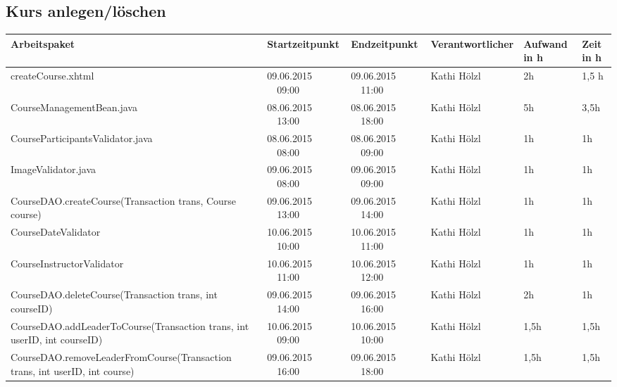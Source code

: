 \begin{landscape}
	\subsection{Kurs anlegen/löschen}
	\begin{tabular}{|p{10.3cm}|p{3.2cm}|p{3.2cm}|p{3.5cm}|p{1.7cm}|p{1.5cm}|}
		\hline  \textbf{Arbeitspaket} & \textbf{Startzeitpunkt} & \textbf{Endzeitpunkt} & \textbf{Verantwortlicher}  & \textbf{Aufwand in h} & \textbf{Zeit in h}\\ 
		\hline   createCourse.xhtml                                    & 09.06.2015 \ \ 09:00     & 09.06.2015 \ \ 11:00     &       Kathi Hölzl & 2h  & 1,5 h\\
		\hline   CourseManagementBean.java                             & 08.06.2015 \ \ 13:00     & 08.06.2015 \ \ 18:00     &      Kathi Hölzl & 5h & 3,5h\\
		\hline   CourseParticipantsValidator.java                        & 08.06.2015 \ \ 08:00     & 08.06.2015 \ \ 09:00           & Kathi Hölzl &      1h    &      1h      \\
		\hline   ImageValidator.java                                   & 09.06.2015 \ \ 08:00     & 09.06.2015 \ \ 09:00      & Kathi Hölzl  &      1h              &      1h    \\
		\hline   CourseDAO.createCourse(Transaction trans, Course course)    & 09.06.2015 \ \ 13:00     & 09.06.2015 \ \ 14:00             & Kathi Hölzl  &      1h       &      1h      \\
		\hline   CourseDateValidator                                         & 10.06.2015 \ \ 10:00     & 10.06.2015 \ \ 11:00           & Kathi Hölzl  &      1h &      1h\\
		\hline   CourseInstructorValidator                                   & 10.06.2015 \ \ 11:00     & 10.06.2015 \ \ 12:00            & Kathi Hölzl  &      1h  &      1h \\
		\hline   CourseDAO.deleteCourse(Transaction trans, int courseID)     & 09.06.2015 \ \ 14:00     & 09.06.2015 \ \ 16:00                & Kathi Hölzl  &      2h   &      1h  \\
		\hline   CourseDAO.addLeaderToCourse(Transaction trans, int userID, int courseID)    & 10.06.2015 \ \ 09:00     & 10.06.2015 \ \ 10:00       & Kathi Hölzl &   1,5h&   1,5h\\
		\hline   CourseDAO.removeLeaderFromCourse(Transaction trans, int userID, int course) & 09.06.2015 \ \ 16:00     & 09.06.2015 \ \ 18:00       & Kathi Hölzl &   1,5h&   1,5h\\

\end{tabular}
\end{landscape}
